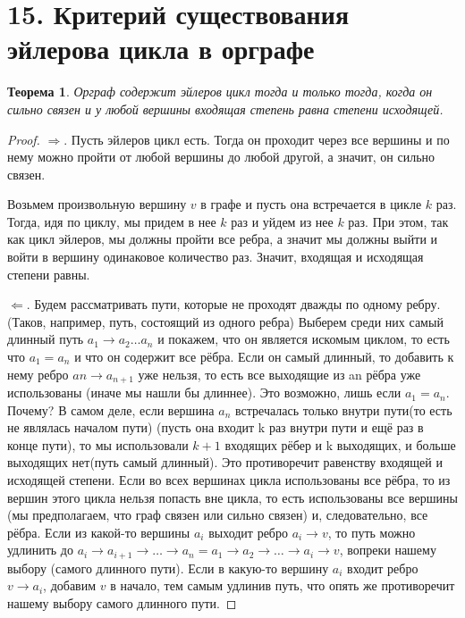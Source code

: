\documentclass[a4paper,12pt]{article}
\newtheorem*{ther}{Теорема}
\begin{document}
	\section*{15. Критерий существования эйлерова цикла в орграфе}
	\begin{ther}
		Орграф содержит эйлеров цикл тогда и только тогда, когда он сильно связен и у любой вершины входящая степень равна степени исходящей.
	\end{ther}
	
	\begin{proof}
		
		$\Rightarrow$. Пусть эйлеров цикл есть. Тогда он проходит через все вершины и по нему можно пройти от любой вершины до любой другой, а значит, он сильно связен.
		
		Возьмем произвольную вершину $v$ в графе и пусть она встречается в цикле $k$ раз. Тогда, идя по циклу, мы придем в нее $k$ раз и уйдем из нее $k$ раз. При этом, так как цикл эйлеров, мы должны пройти все ребра, а значит мы должны выйти и войти в вершину одинаковое количество раз. Значит, входящая и исходящая степени равны.
		
		
		$\Leftarrow$. Будем рассматривать пути, которые не проходят дважды по одному ребру. (Таков,
		например, путь, состоящий из одного ребра) Выберем среди них самый длинный путь
		$a_1 \rightarrow a_2 \ldots a_n$ и покажем, что он является искомым циклом, то есть что
		$a_1 = a_n$ и что он содержит все рёбра.
		Если он самый длинный, то добавить к нему ребро $an \rightarrow a_{n+1}$ уже нельзя, то есть все
		выходящие из an рёбра уже использованы (иначе мы нашли бы длиннее). Это возможно,
		лишь если $a_1 = a_n$. Почему? В самом деле, если вершина $a_n$ встречалась только внутри
		пути(то есть не являлась началом пути) (пусть она входит k раз внутри пути и ещё раз в
		конце пути), то мы использовали $k + 1$ входящих рёбер и k выходящих, и больше
		выходящих нет(путь самый длинный).
		Это противоречит равенству входящей и исходящей степени.
		Если во всех вершинах цикла использованы все рёбра,
		то из вершин этого цикла нельзя попасть вне цикла, то есть использованы все вершины
		(мы предполагаем, что граф связен или сильно связен) и, следовательно, все рёбра.
		Если из какой-то вершины $a_i$ выходит ребро $a_i \rightarrow v$, то путь можно удлинить до
		$a_i \rightarrow a_{i+1} \rightarrow \ldots \rightarrow a_n = a_1 \rightarrow a_2 \rightarrow \ldots \rightarrow a_i \rightarrow v$, вопреки нашему выбору (самого
		длинного пути). Если в какую-то вершину $a_i$ входит ребро $v \rightarrow a_i$, добавим $v$ в начало,
		тем самым удлинив путь, что опять же противоречит нашему выбору самого длинного
		пути.
	\end{proof}
	
\end{document}
